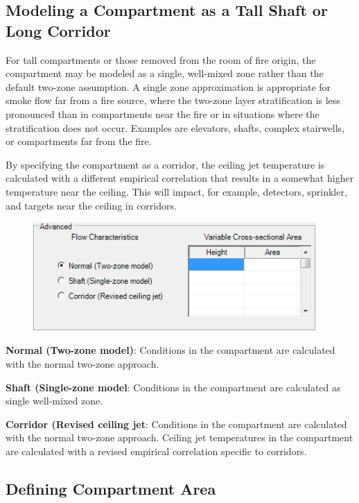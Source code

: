 \subsection{Modeling a Compartment as a Tall Shaft or Long Corridor}

For tall compartments or those removed from the room of fire origin, the compartment may be modeled as a single, well-mixed zone rather than the default two-zone assumption. A single zone approximation is appropriate for smoke flow far from a fire source, where the two-zone layer stratification is less pronounced than in compartments near the fire or in situations where the stratification does not occur. Examples are elevators, shafts, complex stairwells, or compartments far from the fire.

By specifying the compartment as a corridor, the ceiling jet temperature is calculated with a different empirical correlation that results in a somewhat higher temperature near the ceiling.  This will impact, for example, detectors, sprinkler, and targets near the ceiling in corridors.

\begin{figure}[h!]
\begin{center}
\includegraphics[width=4.25in]{FIGURES/Input_File/Corridor_Flow}
\end{center}
\end{figure}

\textbf{Normal (Two-zone model)}: Conditions in the compartment are calculated with the normal two-zone approach.

\textbf{Shaft (Single-zone model}: Conditions in the compartment are calculated as single well-mixed zone.

\textbf{Corridor (Revised ceiling jet}: Conditions in the compartment are calculated with the normal two-zone approach. Ceiling jet temperatures in the compartment are calculated with a revised empirical correlation specific to corridors.


\subsection{Defining Compartment Area}

